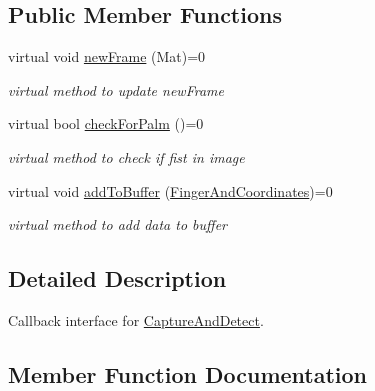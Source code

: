 \subsection*{Public Member Functions}
\begin{DoxyCompactItemize}
\item 
virtual void \hyperlink{classGestro_1_1CaptureAndDetectCallbackInterface_a9a42d0f1b3fd64cea607eeb4e6a46287}{new\+Frame} (Mat)=0
\begin{DoxyCompactList}\small\item\em virtual method to update new\+Frame \end{DoxyCompactList}\item 
virtual bool \hyperlink{classGestro_1_1CaptureAndDetectCallbackInterface_a38fd706c69e3e6839b7328d88f09d7c1}{check\+For\+Palm} ()=0
\begin{DoxyCompactList}\small\item\em virtual method to check if fist in image \end{DoxyCompactList}\item 
virtual void \hyperlink{classGestro_1_1CaptureAndDetectCallbackInterface_a8397891f6177ba6257e9cc978d9ddd52}{add\+To\+Buffer} (\hyperlink{classGestureDetection_1_1FingerAndCoordinates}{Finger\+And\+Coordinates})=0
\begin{DoxyCompactList}\small\item\em virtual method to add data to buffer \end{DoxyCompactList}\end{DoxyCompactItemize}


\subsection{Detailed Description}
Callback interface for \hyperlink{classGestro_1_1CaptureAndDetect}{Capture\+And\+Detect}. 

\subsection{Member Function Documentation}
\mbox{\label{classGestro_1_1CaptureAndDetectCallbackInterface_a8397891f6177ba6257e9cc978d9ddd52}} 
